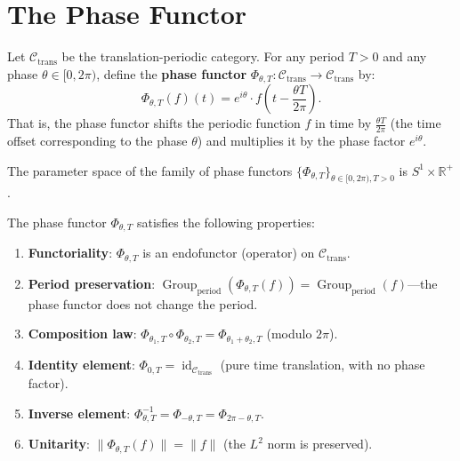 \section{The Phase Functor}\label{sec:phase_functor}

\begin{definition}\label{def:phase_functor_general}
Let $\mathcal{C}_{\text{trans}}$ be the translation-periodic category. For any period $T > 0$ and any phase $\theta \in [0, 2\pi)$, define the \textbf{phase functor} $\Phi_{\theta, T}: \mathcal{C}_{\text{trans}} \to \mathcal{C}_{\text{trans}}$ by:
\[
\Phi_{\theta, T}(f)(t) = e^{i\theta} \cdot f\!\left( t - \frac{\theta T}{2\pi} \right).
\]
That is, the phase functor shifts the periodic function $f$ in time by $\frac{\theta T}{2\pi}$ (the time offset corresponding to the phase $\theta$) and multiplies it by the phase factor $e^{i\theta}$.

The parameter space of the family of phase functors $\{\Phi_{\theta, T}\}_{\theta \in [0, 2\pi), T > 0}$ is $S^1 \times \mathbb{R}^+$.
\end{definition}

\begin{proposition}\label{prop:phase_functor_properties}
The phase functor $\Phi_{\theta, T}$ satisfies the following properties:
\begin{enumerate}[label=(\roman*)]
    \item \textbf{Functoriality}: $\Phi_{\theta, T}$ is an endofunctor (operator) on $\mathcal{C}_{\text{trans}}$.
    \item \textbf{Period preservation}: $\operatorname{Group}_{\mathrm{period}}(\Phi_{\theta, T}(f)) = \operatorname{Group}_{\mathrm{period}}(f)$---the phase functor does not change the period.
    \item \textbf{Composition law}: $\Phi_{\theta_1, T} \circ \Phi_{\theta_2, T} = \Phi_{\theta_1 + \theta_2, T}$ (modulo $2\pi$).
    \item \textbf{Identity element}: $\Phi_{0, T} = \operatorname{id}_{\mathcal{C}_{\text{trans}}}$ (pure time translation, with no phase factor).
    \item \textbf{Inverse element}: $\Phi_{\theta, T}^{-1} = \Phi_{-\theta, T} = \Phi_{2\pi - \theta, T}$.
    \item \textbf{Unitarity}: $\|\Phi_{\theta, T}(f)\| = \|f\|$ (the $L^2$ norm is preserved).
\end{enumerate}
\end{proposition}

